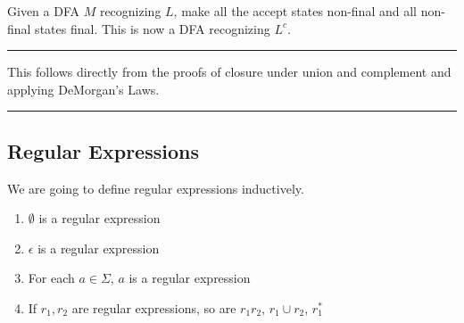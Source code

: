 \documentclass[twoside]{article}
\newenvironment{proof}{{\bf Proof:}}{\hfill\rule{2mm}{2mm}}
\begin{document}

\begin{proof}
	Given a DFA $M$ recognizing $L$, make all the accept states non-final and all non-final states final.  This is now a DFA recognizing $L^c$.
\end{proof}



\begin{proof}
	This follows directly from the proofs of closure under union and complement and applying DeMorgan's Laws.
	
\end{proof}




\subsection*{Regular Expressions}



We are going to define regular expressions inductively.

\begin{enumerate}
	\item[] $\emptyset$ is a regular expression
	\item[] $\epsilon$ is a regular expression
	\item[] For each $a\in\Sigma$, $a$ is a regular expression
	\item[] If $r_1,r_2$ are regular expressions, so are $r_1 r_2$, $r_1\cup r_2$, $r_1^*$
	
\end{enumerate}


\end{document}
